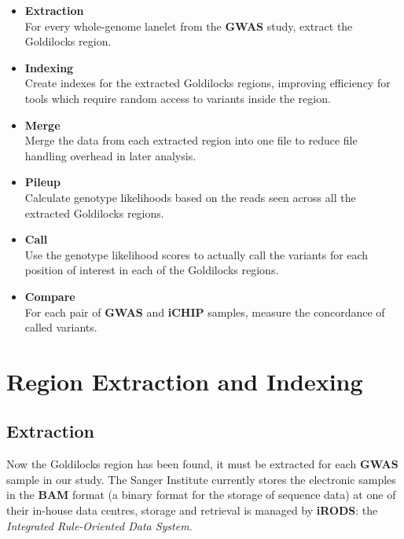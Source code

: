 \begin{itemize}
    \item \textbf{Extraction} \hfill\\
        For every whole-genome lanelet from the \textbf{GWAS} study, extract the
        Goldilocks region.
    \item \textbf{Indexing} \hfill\\
        Create indexes for the extracted Goldilocks regions, improving
        efficiency for tools which require random access to variants inside the
        region.
    \item \textbf{Merge} \hfill\\
        Merge the data from each extracted region into one file to reduce file
        handling overhead in later analysis.
    \item \textbf{Pileup} \hfill\\
        Calculate genotype likelihoods based on the reads seen across all the
        extracted Goldilocks regions.
    \item \textbf{Call} \hfill\\
        Use the genotype likelihood scores to actually call the variants for
        each position of interest in each of the Goldilocks regions.
    \item \textbf{Compare} \hfill\\
        For each pair of \textbf{GWAS} and \textbf{iCHIP} samples, measure the
        concordance of called variants.
\end{itemize}

\section{Region Extraction and Indexing}
\subsection{Extraction}

Now the Goldilocks region has been found, it must be extracted for each
\textbf{GWAS} sample in our study. The Sanger Institute currently stores the
electronic samples in the \textbf{BAM}\citep{bam} format (a binary format for
the storage of sequence data) at one of their in-house data centres, storage and
retrieval is managed by \textbf{iRODS}\citep{irods}: the \textit{Integrated
Rule-Oriented Data System}.

